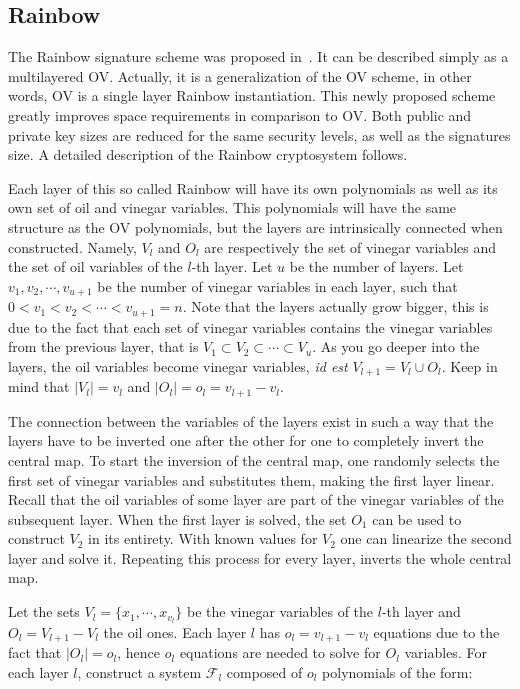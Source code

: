 \documentclass{ufsctex/ufsctex}
\begin{document}
\subsection{Rainbow}

The Rainbow signature scheme was proposed in~\cite{ding2005rainbow}. It can be
described simply as a multilayered OV. Actually, it is a generalization of the
OV scheme, in other words, OV is a single layer Rainbow instantiation. This
newly proposed scheme greatly improves space requirements in comparison to OV.
Both public and private key sizes are reduced for the same security levels, as
well as the signatures size. A detailed description of the Rainbow cryptosystem
follows.

Each layer of this so called Rainbow will have its own polynomials as well as
its own set of oil and vinegar variables. This polynomials will have the same
structure as the OV polynomials, but the layers are intrinsically connected
when constructed. Namely, $V_l$ and $O_l$ are respectively the set of vinegar
variables and the set of oil variables of the $l$-th layer. Let $u$ be the
number of layers. Let $v_1, v_2, \cdots, v_{u+1}$ be the number of vinegar
variables in each layer, such that $0 < v_1 < v_2 < \cdots < v_{u+1} = n$. Note
that the layers actually grow bigger, this is due to the fact that each set of
vinegar variables contains the vinegar variables from the previous layer, that
is $V_1 \subset V_2 \subset \cdots \subset V_{u}$. As you go deeper into the
layers, the oil variables become vinegar variables, \textit{id est} $V_{l+1} =
V_l \cup O_l$. Keep in mind that $|V_l| = v_l$ and $|O_l| = o_l = v_{l+1} -
v_{l}$.

The connection between the variables of the layers exist in such a way that the
layers have to be inverted one after the other for one to completely invert the
central map. To start the inversion of the central map, one randomly selects
the first set of vinegar variables and substitutes them, making the first layer
linear. Recall that the oil variables of some layer are part of the vinegar
variables of the subsequent layer. When the first layer is solved, the set
$O_1$ can be used to construct $V_2$ in its entirety. With known values for
$V_2$ one can linearize the second layer and solve it. Repeating this process
for every layer, inverts the whole central map.

Let the sets $V_l = \{x_1, \cdots, x_{v_l}\}$ be the vinegar variables of the
$l$-th layer and $O_l = V_{l+1} - V_l$ the oil ones. Each layer $l$ has $o_l =
v_{l+1} - v_{l}$ equations due to the fact that $|O_l| = o_l$, hence $o_l$
equations are needed to solve for $O_l$ variables. For each layer $l$,
construct a system $\mathcal{F}_l$ composed of $o_l$ polynomials of the form:
\end{document}
